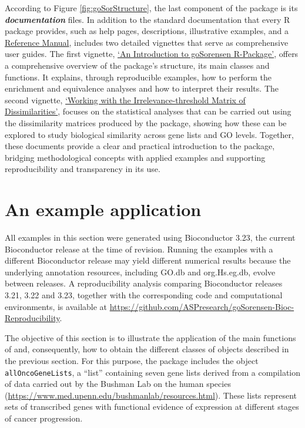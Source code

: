 According to Figure \ref{fig:goSorStructure}, the last component of the  package is its \textbf{\emph{documentation}} files. In addition to the standard documentation that every R package provides, such as help pages, descriptions, illustrative examples, and a \href{https://www.bioconductor.org/packages/release/bioc/manuals/goSorensen/man/goSorensen.pdf}{Reference Manual},  includes two detailed vignettes that serve as comprehensive user guides. The first vignette, \href{https://www.bioconductor.org/packages/release/bioc/vignettes/goSorensen/inst/doc/goSorensen_Introduction.html}{`An Introduction to goSorensen R-Package'}, offers a comprehensive overview of the package's structure, its main classes and functions. It explains, through reproducible examples, how to perform the enrichment and equivalence analyses and how to interpret their results. The second vignette, \href{https://www.bioconductor.org/packages/release/bioc/vignettes/goSorensen/inst/doc/Dissimilarities_Matrix.html}{`Working with the Irrelevance-threshold Matrix of Dissimilarities'}, focuses on the statistical analyses that can be carried out using the dissimilarity matrices produced by the package, showing how these can be explored to study biological similarity across gene lists and GO levels. Together, these documents provide a clear and practical introduction to the package, bridging methodological concepts with applied examples and supporting reproducibility and transparency in its use.

\section{An example application}\label{an-example-application}

All examples in this section were generated using Bioconductor 3.23, the current Bioconductor release at the time of revision. Running the examples with a different Bioconductor release may yield different numerical results because the underlying annotation resources, including GO.db and org.Hs.eg.db, evolve between releases. A reproducibility analysis comparing Bioconductor releases 3.21, 3.22 and 3.23, together with the corresponding code and computational environments, is available at \url{https://github.com/ASPresearch/goSorensen-Bioc-Reproducibility}.

The objective of this section is to illustrate the application of the main functions of  and, consequently, how to obtain the different classes of objects described in the previous section. For this purpose, the package includes the object \texttt{allOncoGeneLists}, a ``list'' containing seven gene lists derived from a compilation of data carried out by the Bushman Lab on the human species (\url{https://www.med.upenn.edu/bushmanlab/resources.html}). These lists represent sets of transcribed genes with functional evidence of expression at different stages of cancer progression.

